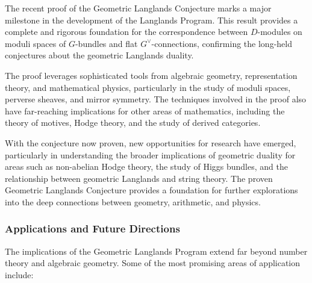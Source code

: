 \documentclass{article}
\theoremstyle{remark}
\begin{document}
The recent proof of the Geometric Langlands Conjecture marks a major milestone in the development of the Langlands Program. This result provides a complete and rigorous foundation for the correspondence between $D$-modules on moduli spaces of $G$-bundles and flat $G^\vee$-connections, confirming the long-held conjectures about the geometric Langlands duality.

The proof leverages sophisticated tools from algebraic geometry, representation theory, and mathematical physics, particularly in the study of moduli spaces, perverse sheaves, and mirror symmetry. The techniques involved in the proof also have far-reaching implications for other areas of mathematics, including the theory of motives, Hodge theory, and the study of derived categories.

With the conjecture now proven, new opportunities for research have emerged, particularly in understanding the broader implications of geometric duality for areas such as non-abelian Hodge theory, the study of Higgs bundles, and the relationship between geometric Langlands and string theory. The proven Geometric Langlands Conjecture provides a foundation for further explorations into the deep connections between geometry, arithmetic, and physics.

\subsubsection{Applications and Future Directions}

The implications of the Geometric Langlands Program extend far beyond number theory and algebraic geometry. Some of the most promising areas of application include:
\end{document}

